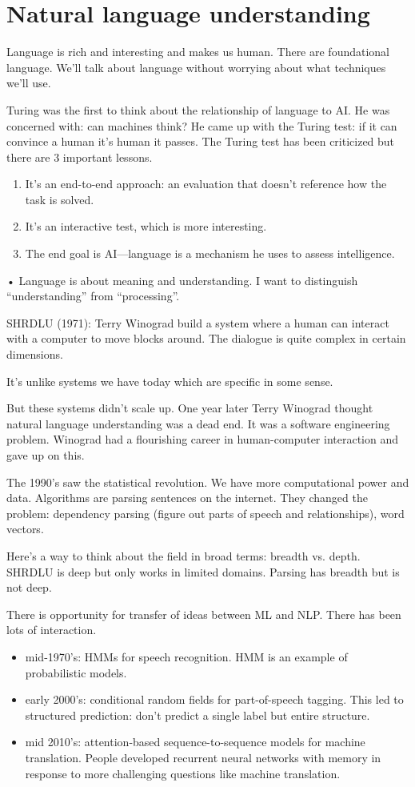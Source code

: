 \section{Natural language understanding}

Language is rich and interesting and makes us human. There are foundational language. We'll talk about language without worrying about what techniques we'll use.

Turing was the first to think about the relationship of language to AI. He was concerned with: can machines think? He came up with the Turing test: if it can convince a human it's human it passes. The Turing test has been criticized but there are 3 important lessons.
\begin{enumerate}
\item
It's an end-to-end approach: an evaluation that doesn't reference how the task is solved.
\item
It's an interactive test, which is more interesting.
\item
The end goal is AI---language is a mechanism he uses to assess intelligence.
\end{enumerate}•
Language is about meaning and understanding. I want to distinguish ``understanding'' from ``processing''.

SHRDLU (1971): Terry Winograd build a system where a human can interact with a computer to move blocks around. The dialogue is quite complex in certain dimensions.

It's unlike systems we have today which are specific in some sense.

But these systems didn't scale up. One year later Terry Winograd thought natural language understanding was a dead end. It was a software engineering problem. Winograd had a flourishing career in human-computer interaction and gave up on this.

The 1990's saw the statistical revolution. We have more computational power and data. Algorithms are parsing sentences on the internet. They changed the problem: dependency parsing (figure out parts of speech and relationships), word vectors.

Here's a way to think about the field in broad terms: breadth vs. depth. SHRDLU is deep but only works in limited domains. Parsing has breadth but is not deep.

There is opportunity for transfer of ideas between ML and NLP. There has been lots of interaction.
\begin{itemize}
\item
mid-1970's: HMMs for speech recognition. HMM is an example of probabilistic models.
\item
early 2000's: conditional random fields for part-of-speech tagging. This led to structured prediction: don't predict a single label but entire structure.
\item
mid 2010's: attention-based sequence-to-sequence models for machine translation. People developed recurrent neural networks with memory in response to more challenging questions like machine translation.
\end{itemize}

